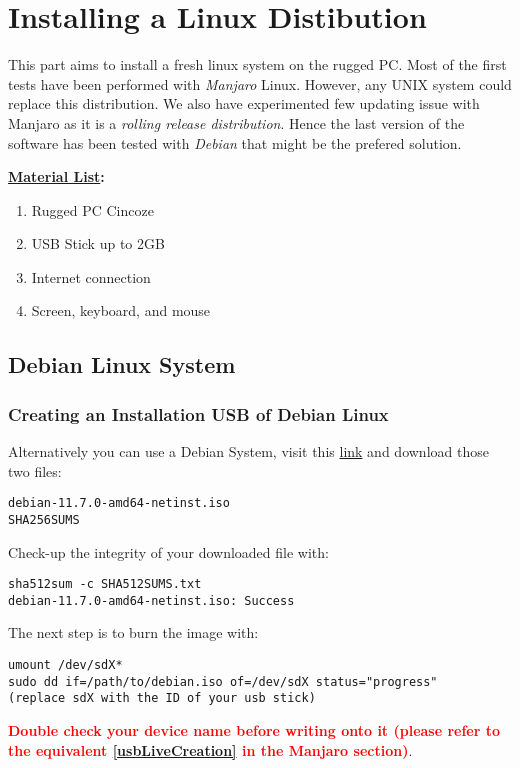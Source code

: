 \section{Installing a Linux Distibution}


\noindent{}
\vspace{10pt}

This part aims to install a fresh linux system on the rugged PC. Most of the first
tests have been performed with \textit{Manjaro} Linux. However, any UNIX system could 
replace this distribution. We also have experimented few updating issue with
Manjaro as it is a \textit{rolling release distribution}. Hence the last version of 
the software has been tested with \textit{Debian} that might be the prefered
solution.

\vspace{10pt}
\noindent\textbf{\underline{Material List}:}
\begin{enumerate}
		\item Rugged PC Cincoze
		\item USB Stick up to 2GB
		\item Internet connection
		\item Screen, keyboard, and mouse
\end{enumerate}

\subsection{Debian Linux System}
\subsubsection{Creating an Installation USB of Debian Linux}
\par Alternatively you can use a Debian System, visit this 
\href{https://cdimage.debian.org/debian-cd/current/amd64/iso-cd/}{link}
and download those two files:
\vspace{-10pt}
\begin{lstlisting}
debian-11.7.0-amd64-netinst.iso
SHA256SUMS
\end{lstlisting}
Check-up the integrity of your downloaded file with:
\vspace{-10pt}
\begin{lstlisting}
sha512sum -c SHA512SUMS.txt
debian-11.7.0-amd64-netinst.iso: Success
\end{lstlisting}
The next step is to burn the image with:
\vspace{-11pt}
\begin{lstlisting}
umount /dev/sdX*
sudo dd if=/path/to/debian.iso of=/dev/sdX status="progress"
(replace sdX with the ID of your usb stick)
\end{lstlisting}
\vspace{6pt}
\textbf{\textcolor{red}{Double check your device name before writing onto
it (please refer to the equivalent \ref{usbLiveCreation} in the Manjaro
section)}}.

